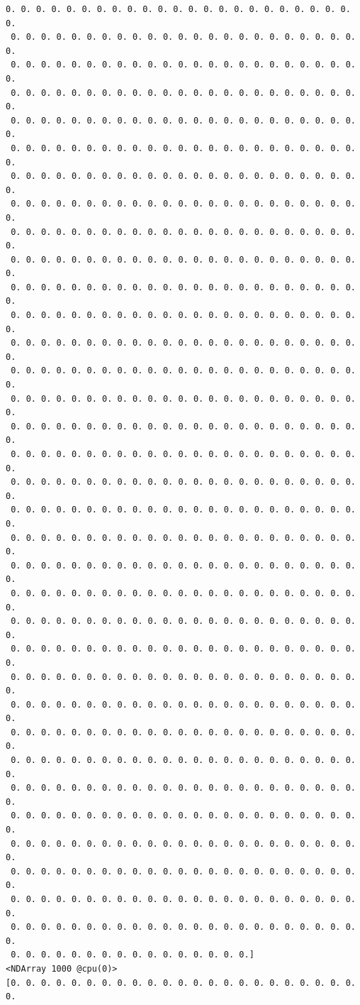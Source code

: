 \documentclass[11pt]{article}
\begin{document}
\begin{Verbatim}[commandchars=\\\{\}]
 0. 0. 0. 0. 0. 0. 0. 0. 0. 0. 0. 0. 0. 0. 0. 0. 0. 0. 0. 0. 0. 0. 0. 0.
 0. 0. 0. 0. 0. 0. 0. 0. 0. 0. 0. 0. 0. 0. 0. 0. 0. 0. 0. 0. 0. 0. 0. 0.
 0. 0. 0. 0. 0. 0. 0. 0. 0. 0. 0. 0. 0. 0. 0. 0. 0. 0. 0. 0. 0. 0. 0. 0.
 0. 0. 0. 0. 0. 0. 0. 0. 0. 0. 0. 0. 0. 0. 0. 0. 0. 0. 0. 0. 0. 0. 0. 0.
 0. 0. 0. 0. 0. 0. 0. 0. 0. 0. 0. 0. 0. 0. 0. 0. 0. 0. 0. 0. 0. 0. 0. 0.
 0. 0. 0. 0. 0. 0. 0. 0. 0. 0. 0. 0. 0. 0. 0. 0. 0. 0. 0. 0. 0. 0. 0. 0.
 0. 0. 0. 0. 0. 0. 0. 0. 0. 0. 0. 0. 0. 0. 0. 0. 0. 0. 0. 0. 0. 0. 0. 0.
 0. 0. 0. 0. 0. 0. 0. 0. 0. 0. 0. 0. 0. 0. 0. 0. 0. 0. 0. 0. 0. 0. 0. 0.
 0. 0. 0. 0. 0. 0. 0. 0. 0. 0. 0. 0. 0. 0. 0. 0. 0. 0. 0. 0. 0. 0. 0. 0.
 0. 0. 0. 0. 0. 0. 0. 0. 0. 0. 0. 0. 0. 0. 0. 0. 0. 0. 0. 0. 0. 0. 0. 0.
 0. 0. 0. 0. 0. 0. 0. 0. 0. 0. 0. 0. 0. 0. 0. 0. 0. 0. 0. 0. 0. 0. 0. 0.
 0. 0. 0. 0. 0. 0. 0. 0. 0. 0. 0. 0. 0. 0. 0. 0. 0. 0. 0. 0. 0. 0. 0. 0.
 0. 0. 0. 0. 0. 0. 0. 0. 0. 0. 0. 0. 0. 0. 0. 0. 0. 0. 0. 0. 0. 0. 0. 0.
 0. 0. 0. 0. 0. 0. 0. 0. 0. 0. 0. 0. 0. 0. 0. 0. 0. 0. 0. 0. 0. 0. 0. 0.
 0. 0. 0. 0. 0. 0. 0. 0. 0. 0. 0. 0. 0. 0. 0. 0. 0. 0. 0. 0. 0. 0. 0. 0.
 0. 0. 0. 0. 0. 0. 0. 0. 0. 0. 0. 0. 0. 0. 0. 0. 0. 0. 0. 0. 0. 0. 0. 0.
 0. 0. 0. 0. 0. 0. 0. 0. 0. 0. 0. 0. 0. 0. 0. 0. 0. 0. 0. 0. 0. 0. 0. 0.
 0. 0. 0. 0. 0. 0. 0. 0. 0. 0. 0. 0. 0. 0. 0. 0. 0. 0. 0. 0. 0. 0. 0. 0.
 0. 0. 0. 0. 0. 0. 0. 0. 0. 0. 0. 0. 0. 0. 0. 0. 0. 0. 0. 0. 0. 0. 0. 0.
 0. 0. 0. 0. 0. 0. 0. 0. 0. 0. 0. 0. 0. 0. 0. 0. 0. 0. 0. 0. 0. 0. 0. 0.
 0. 0. 0. 0. 0. 0. 0. 0. 0. 0. 0. 0. 0. 0. 0. 0. 0. 0. 0. 0. 0. 0. 0. 0.
 0. 0. 0. 0. 0. 0. 0. 0. 0. 0. 0. 0. 0. 0. 0. 0. 0. 0. 0. 0. 0. 0. 0. 0.
 0. 0. 0. 0. 0. 0. 0. 0. 0. 0. 0. 0. 0. 0. 0. 0. 0. 0. 0. 0. 0. 0. 0. 0.
 0. 0. 0. 0. 0. 0. 0. 0. 0. 0. 0. 0. 0. 0. 0. 0. 0. 0. 0. 0. 0. 0. 0. 0.
 0. 0. 0. 0. 0. 0. 0. 0. 0. 0. 0. 0. 0. 0. 0. 0. 0. 0. 0. 0. 0. 0. 0. 0.
 0. 0. 0. 0. 0. 0. 0. 0. 0. 0. 0. 0. 0. 0. 0. 0. 0. 0. 0. 0. 0. 0. 0. 0.
 0. 0. 0. 0. 0. 0. 0. 0. 0. 0. 0. 0. 0. 0. 0. 0. 0. 0. 0. 0. 0. 0. 0. 0.
 0. 0. 0. 0. 0. 0. 0. 0. 0. 0. 0. 0. 0. 0. 0. 0. 0. 0. 0. 0. 0. 0. 0. 0.
 0. 0. 0. 0. 0. 0. 0. 0. 0. 0. 0. 0. 0. 0. 0. 0. 0. 0. 0. 0. 0. 0. 0. 0.
 0. 0. 0. 0. 0. 0. 0. 0. 0. 0. 0. 0. 0. 0. 0. 0. 0. 0. 0. 0. 0. 0. 0. 0.
 0. 0. 0. 0. 0. 0. 0. 0. 0. 0. 0. 0. 0. 0. 0. 0. 0. 0. 0. 0. 0. 0. 0. 0.
 0. 0. 0. 0. 0. 0. 0. 0. 0. 0. 0. 0. 0. 0. 0. 0. 0. 0. 0. 0. 0. 0. 0. 0.
 0. 0. 0. 0. 0. 0. 0. 0. 0. 0. 0. 0. 0. 0. 0. 0. 0. 0. 0. 0. 0. 0. 0. 0.
 0. 0. 0. 0. 0. 0. 0. 0. 0. 0. 0. 0. 0. 0. 0. 0. 0. 0. 0. 0. 0. 0. 0. 0.
 0. 0. 0. 0. 0. 0. 0. 0. 0. 0. 0. 0. 0. 0. 0. 0.]
<NDArray 1000 @cpu(0)> 
[0. 0. 0. 0. 0. 0. 0. 0. 0. 0. 0. 0. 0. 0. 0. 0. 0. 0. 0. 0. 0. 0. 0. 0.

\end{Verbatim}
\end{document}
